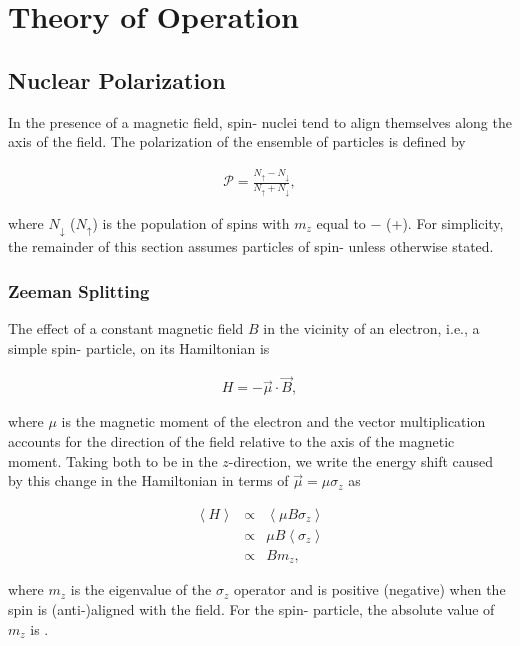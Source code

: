 \chapter{Theory of Operation} 
\label{theory}  
\section{Nuclear Polarization}
In the presence of a magnetic field, spin-\half{} nuclei tend to align themselves along the axis of the field.  The polarization of the ensemble of particles is defined by 

\begin{eqnarray}
\label{eqn:polarization-definition}
\mathcal{P}=\frac{N_\uparrow-N_\downarrow}{N_\uparrow+N_\downarrow},
\end{eqnarray}

where $N_\downarrow$ ($N_\uparrow$) is the population of spins with $m_z$ equal to $-$\half{} (+\half).  For simplicity, the remainder of this section assumes particles of spin-\half{} unless otherwise stated.


\subsection{Zeeman Splitting}
\label{sec:zeemansplitting}

The effect of a constant magnetic field $B$ in the vicinity of an electron, i.e., a simple spin-\half{} particle, on its Hamiltonian is

\begin{eqnarray}
 H=-\vec{\mu}\cdot\vec{B},
\end{eqnarray}

where $\mu$ is the magnetic moment of the electron and the vector multiplication accounts for the direction of the field relative to the axis of the magnetic moment.  Taking both to be in the $z$-direction, we write the energy shift caused by this change in the Hamiltonian in terms of $\vec{\mu}=\mu\sigma_z$ as

\begin{eqnarray}
 \left<H\right>&\propto&\left<\mu B \sigma_z\right>\\
 &\propto&\mu B\left<\sigma_z\right> \\
 &\propto&B m_z,
\end{eqnarray}

where $m_z$ is the eigenvalue of the $\sigma_z$ operator and is positive (negative) when the spin is (anti-)aligned with the field.  For the spin-\half{} particle, the absolute value of $m_z$ is \half{}.

